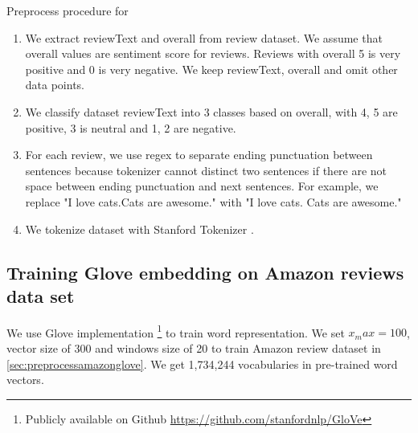 Preprocess procedure for %
\begin{enumerate}
	\item We extract reviewText and overall from review dataset. We assume that overall values are sentiment score for reviews. Reviews with overall 5 is very positive and 0 is very negative. We keep reviewText, overall and omit other data points.
	\item We classify dataset reviewText into 3 classes based on overall, with 4, 5 are positive, 3 is neutral and 1, 2 are negative.
	\item For each review, we use regex to separate ending punctuation between sentences because tokenizer cannot distinct two sentences if there are not space between ending punctuation and next sentences. For example, we replace "I love cats.Cats are awesome." with "I love cats. Cats are awesome." 
	\item We tokenize dataset with Stanford Tokenizer \cite{tokenizerpart}.
\end{enumerate}

\subsection{Training Glove embedding on Amazon reviews data set}\label{sec:gloveamazone}

We use Glove implementation \footnote{Publicly available on Github \url{https://github.com/stanfordnlp/GloVe}} to train word representation. We set $x_max = 100$, vector size of 300 and windows size of 20 to train Amazon review dataset in \ref{sec:preprocessamazonglove}. We get 1,734,244 vocabularies in pre-trained word vectors. 








